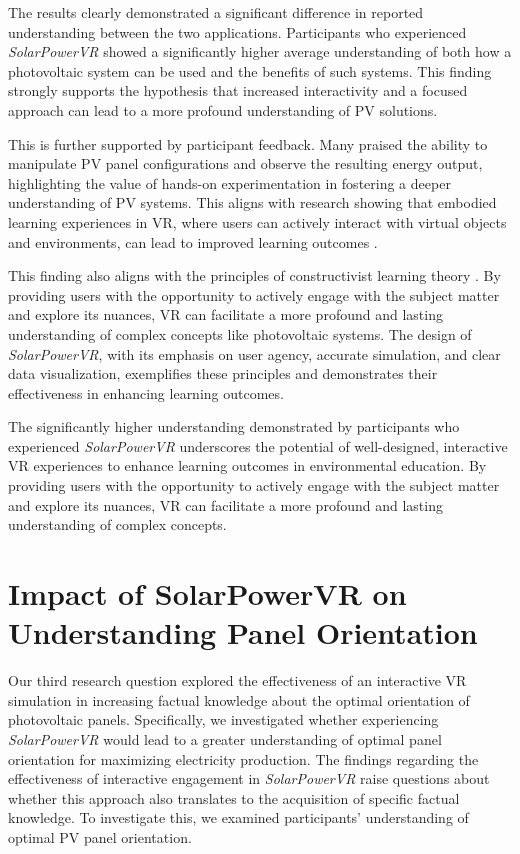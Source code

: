 \documentclass[draft, final]{vutinfth} %
\begin{document}
The results clearly demonstrated a significant difference in reported understanding between the two applications. Participants who experienced \textit{SolarPowerVR} showed a significantly higher average understanding of both how a photovoltaic system can be used and the benefits of such systems. This finding strongly supports the hypothesis that increased interactivity and a focused approach can lead to a more profound understanding of PV solutions.

This is further supported by participant feedback. Many praised the ability to manipulate PV panel configurations and observe the resulting energy output, highlighting the value of hands-on experimentation in fostering a deeper understanding of PV systems. This aligns with research showing that embodied learning experiences in VR, where users can actively interact with virtual objects and environments, can lead to improved learning outcomes \cite{Sung2015Effects, Winn2002Immersion}.

This finding also aligns with the principles of constructivist learning theory \cite{Mikropoulos2011VrEducational}. By providing users with the opportunity to actively engage with the subject matter and explore its nuances, VR can facilitate a more profound and lasting understanding of complex concepts like photovoltaic systems. The design of \textit{SolarPowerVR}, with its emphasis on user agency, accurate simulation, and clear data visualization, exemplifies these principles and demonstrates their effectiveness in enhancing learning outcomes.

The significantly higher understanding demonstrated by participants who experienced \textit{SolarPowerVR} underscores the potential of well-designed, interactive VR experiences to enhance learning outcomes in environmental education. By providing users with the opportunity to actively engage with the subject matter and explore its nuances, VR can facilitate a more profound and lasting understanding of complex concepts.

\section{Impact of SolarPowerVR on Understanding Panel Orientation}

Our third research question explored the effectiveness of an interactive VR simulation in increasing factual knowledge about the optimal orientation of photovoltaic panels. Specifically, we investigated whether experiencing \textit{SolarPowerVR} would lead to a greater understanding of optimal panel orientation for maximizing electricity production. The findings regarding the effectiveness of interactive engagement in \textit{SolarPowerVR} raise questions about whether this approach also translates to the acquisition of specific factual knowledge. To investigate this, we examined participants' understanding of optimal PV panel orientation.
\end{document}
